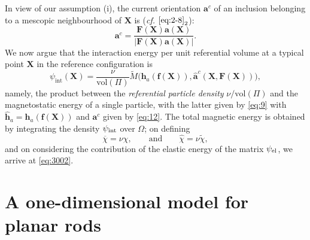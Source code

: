 \documentclass[oneside]{article}
\begin{document}
			In view of our assumption (i), the current orientation $\bm a^c$ of an inclusion belonging to a mescopic neighbourhood of $\bm X$ is (\emph{cf.} $\eqref{eq:2-8}_2$):
			\begin{equation}\label{eq:12}
			\bm a^c=\frac{\bm F(\bm X)\bm a(\bm X)}{|\bm F(\bm X)\bm a(\bm X)|}.
			\end{equation}
			We now argue that the interaction energy per unit referential volume at a typical point $\bm X$ in the reference configuration is
			\begin{equation}
			{\psi}_{\text{int}}(\bm X)=\frac{{\nu}}{\text{vol}(\Pi)}\widetilde{M}\big(\bm h_a(\bm f(\bm X)),\widehat{\bm a}^c(\bm X,\bm F(\bm X))\big),
			\label{MagneticEnergy}
			\end{equation}
			namely, the product between the \emph{referential particle density} $\nu/\text{vol}(\Pi)$ and the magnetostatic energy of a single particle, with the latter given by \eqref{eq:9} with $\widehat{\bm h}_a=\bm h_a(\bm f(\bm X))$ and $\bm a^c$ given by \eqref{eq:12}. The total magnetic energy is obtained by integrating the density $\psi_{\rm int}$ over $\Omega$; on defining
			\begin{equation}\label{eq:2-13}
			\overline\chi=\nu\chi,\qquad\text{and}\qquad \widehat\chi=\nu\tilde\chi,
			\end{equation}
			and on considering the contribution of the elastic energy of the matrix $\psi_{\rm{el}}$, we arrive at \eqref{eq:3002}.
			
			
			
			
			\section{A one-dimensional model for planar rods}
			
\end{document}

